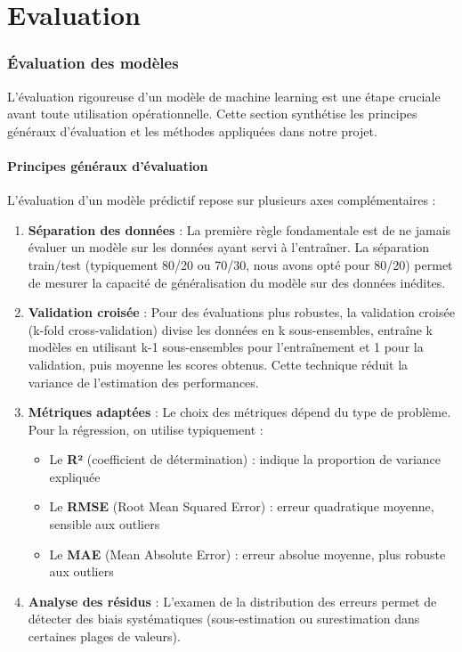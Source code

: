 \documentclass[11pt,a4paper]{article}
\newcommand{\currentpart}{}
\let\oldpart\part
\renewcommand{\part}[1]{%
  \oldpart{#1}%
  \renewcommand{\currentpart}{\thepart.\ #1}%
  \markboth{\currentpart}{}%
}
\begin{document}
\part{Evaluation}
\section{Évaluation des modèles}

L'évaluation rigoureuse d'un modèle de machine learning est une étape cruciale avant toute utilisation opérationnelle. Cette section synthétise les principes généraux d'évaluation et les méthodes appliquées dans notre projet.

\subsection{Principes généraux d'évaluation}

L'évaluation d'un modèle prédictif repose sur plusieurs axes complémentaires :

\begin{enumerate}
    \item \textbf{Séparation des données} : La première règle fondamentale est de ne jamais évaluer un modèle sur les données ayant servi à l'entraîner. La séparation train/test (typiquement 80/20 ou 70/30, nous avons opté pour 80/20) permet de mesurer la capacité de généralisation du modèle sur des données inédites.
    
    \item \textbf{Validation croisée} : Pour des évaluations plus robustes, la validation croisée (k-fold cross-validation) divise les données en k sous-ensembles, entraîne k modèles en utilisant k-1 sous-ensembles pour l'entraînement et 1 pour la validation, puis moyenne les scores obtenus. Cette technique réduit la variance de l'estimation des performances.
    
    \item \textbf{Métriques adaptées} : Le choix des métriques dépend du type de problème. Pour la régression, on utilise typiquement :
    \begin{itemize}[noitemsep]
        \item Le \textbf{R²} (coefficient de détermination) : indique la proportion de variance expliquée
        \item Le \textbf{RMSE} (Root Mean Squared Error) : erreur quadratique moyenne, sensible aux outliers
        \item Le \textbf{MAE} (Mean Absolute Error) : erreur absolue moyenne, plus robuste aux outliers
    \end{itemize}
    
    \item \textbf{Analyse des résidus} : L'examen de la distribution des erreurs permet de détecter des biais systématiques (sous-estimation ou surestimation dans certaines plages de valeurs).
\end{enumerate}
\end{document}

